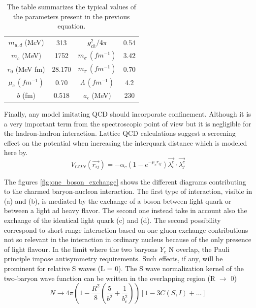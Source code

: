 \documentclass[12pt,a4paper]{book}
\begin{document}
	\begin{table}[h]
		\centering
		\begin{tabular}{|c c | c c|}
			$m_{u,d}$ (MeV) & 313 & $g_{ch}^2 / 4\pi$ & 0.54 \\
			$m_{c}$ (MeV) & 1752 & $m_{\sigma} \, (fm^{-1})$ & 3.42 \\
			$\hat{r_0}$ (MeV fm) & 28.170 &  $m_{\pi} \, (fm^{-1})$ & 0.70 \\
			$\mu_c \, (fm^{-1})$ & 0.70 & $\Lambda \, (fm^{-1})$ & 4.2 \\
			$b$ (fm) & 0.518 & $a_c$ (MeV) & 230 \\
		\end{tabular}
		\caption{The table summarizes the typical values of the parameters present in the previous equation.}
		\label{tab:par-resume}
	\end{table}
	
	Finally, any model imitating QCD should incorporate confinement. Although it is a very important term from the spectroscopic point of view but it is negligible for the hadron-hadron interaction. Lattice QCD calculations suggest a screening effect on the potential when increasing the interquark distance which is modeled here by.
	\begin{equation}
		V_{CON}(\vec{r_{ij}})= -\alpha_c (1-e^{-\mu_c r_{ij}}) \vec{\lambda_i^c} \cdot \vec{\lambda_j^c}
		\label{eq:confinement}
	\end{equation}
	
	The figures \ref{fig:one_boson_exchange} shows the different diagrams contributing to the charmed baryon-nucleon interaction. The first type of interaction, visible in (a) and (b), is mediated by the exchange of a boson between light quark or between a light ad heavy flavor. The second one instead take in account also the exchange of the identical light quark (c) and (d). The second possibility correspond to short range interaction based on one-gluon exchange contributions not so relevant in the interaction in ordinary nucleus because of the only presence of light flavour. In the limit where the two baryons $Y_c$ N overlap, the Pauli principle impose antisymmetry requirements. Such effects, if any, will be	prominent for relative S waves (L = 0).
	The S wave normalization kernel of the two-baryon wave function can be written in the overlapping region (R $\rightarrow$ 0)
	\begin{equation}
		N \rightarrow  4 \pi \left( 1 - \frac{R^2}{8} \left( \frac{5}{b^2} + \frac{1}{b_c^2} \right) \right) \left[ 1 - 3C(S,I) + \dots \right]
	\end{equation}
	
\end{document}
